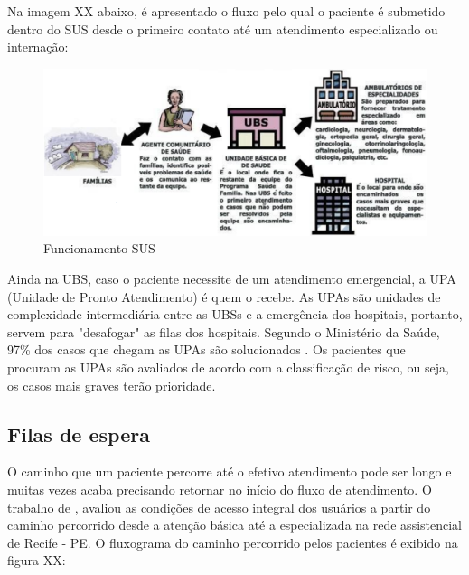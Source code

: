    Na imagem XX abaixo, é apresentado o fluxo pelo qual o paciente é submetido dentro do SUS desde o primeiro contato até um atendimento especializado ou internação:
    
     \begin{figure}[htbp]
        	\centering
            \caption{Funcionamento SUS}
            \label{fig:images/fluxograma-trajetoria-usf-pe}
            \includegraphics[width=0.9\linewidth]{images/funcionamento-sus.png}
        \end{figure}
    
    Ainda na UBS, caso o paciente necessite de um atendimento emergencial, a UPA (Unidade de Pronto Atendimento) é quem o recebe. As UPAs são unidades de complexidade intermediária entre  as UBSs e a emergência dos hospitais, portanto, servem para "desafogar" as filas dos hospitais. Segundo o Ministério da Saúde, 97\% dos casos que chegam as UPAs são solucionados . Os pacientes que procuram as UPAs são avaliados de acordo com a classificação de risco, ou seja, os casos mais graves terão prioridade.
    
     \subsection{Filas de espera}
    
    O caminho que um paciente percorre até o efetivo atendimento pode ser longo e muitas vezes acaba precisando retornar no início do fluxo de atendimento. O trabalho de , avaliou as condições de acesso integral dos usuários a partir do caminho percorrido desde a atenção básica até a especializada na rede assistencial de Recife - PE. O fluxograma do caminho percorrido pelos pacientes é exibido na figura XX:
    
